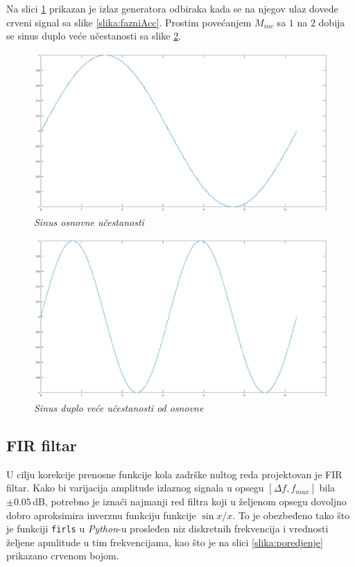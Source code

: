 \documentclass[conference]{IEEEtran}
\begin{document}
Na slici \ref{slika:sin} prikazan je izlaz generatora odbiraka kada se na njegov ulaz dovede crveni signal sa slike \ref{slika:fazniAcc}. Prostim povećanjem $M_{inc}$ sa $1$ na $2$ dobija se sinus duplo veće učestanosti sa slike \ref{slika:sin2}.

\begin{figure}[h]
	\centering
	\includegraphics[scale=0.16]{./slike/sinus.eps}
	\caption{\textsl{Sinus osnovne učestanosti}}
	\label{slika:sin}
\end{figure}

\begin{figure}[h]
	\centering
	\includegraphics[scale=0.16]{./slike/sin2.eps}
	\caption{\textsl{Sinus duplo veće učestanosti od osnovne}}
	\label{slika:sin2}
\end{figure}

\subsection{FIR filtar}
U cilju korekcije prenosne funkcije kola zadrške nultog reda projektovan je FIR filtar. Kako bi varijacija amplitude izlaznog signala u opsegu $[\Delta f, f_{max}]$ bila $\pm 0.05$\,dB, potrebno je iznaći najmanji red filtra koji u željenom opsegu dovoljno dobro aproksimira inverznu funkciju funkcije $\sin x/x$. To je obezbeđeno tako što je funkciji \texttt{firls} u \textsl{Python}-u prosleđen niz diskretnih frekvencija i vrednosti željene apmlitude u tim frekvencijama, kao što je na slici \ref{slika:poredjenje} prikazano crvenom bojom.
\end{document}
